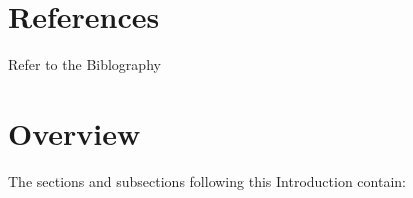 
\section{References}

Refer to the Biblography


\section{Overview}

The sections and subsections following this Introduction contain: